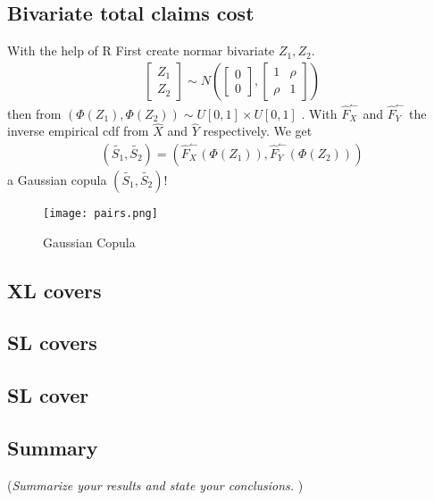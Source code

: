 \documentclass[11pt]{article}
\begin{document}
\subsection*{Bivariate total claims cost}
With the help of R 
First create normar bivariate $Z_1,Z_2$.
\begin{align} \label{eq:bi1}
	 \begin{bmatrix} Z_1 \\ Z_2\end{bmatrix} \sim N\left(\begin{bmatrix} 0 \\ 0\end{bmatrix},\begin{bmatrix} 1&\rho \\ \rho&1\end{bmatrix}\right)
\end{align}
then from   $\left(\Phi(Z_1),\Phi(Z_2)\right) \sim  U[0,1] \times U[0,1]$ .
With $\hat{F}_X^\leftharpoonup$ and $\hat{F}_Y^\leftharpoonup$ the inverse empirical cdf from $\hat{X}$ and $\hat{Y}$ respectively.
We get
\begin{align} \label{eq:bi3}
	  \left(\tilde{S_1},\tilde{S_2}\right) = \left(\hat{F}_X^\leftharpoonup(\Phi(Z_1)),\hat{F}_Y^\leftharpoonup(\Phi(Z_2))\right) 
\end{align}
a Gaussian copula $ \left(\tilde{S_1},\tilde{S_2}\right)$!

 \begin{figure}[H]
 \center
  \texttt{[image: pairs.png]}
  \caption{Gaussian Copula}
  \label{fig:samplefig5}
\end{figure}

\subsection*{XL covers}

\subsection*{SL covers}

\subsection*{SL cover}





\subsection*{Summary}
({\it Summarize your results and state your conclusions. })
\end{document}
